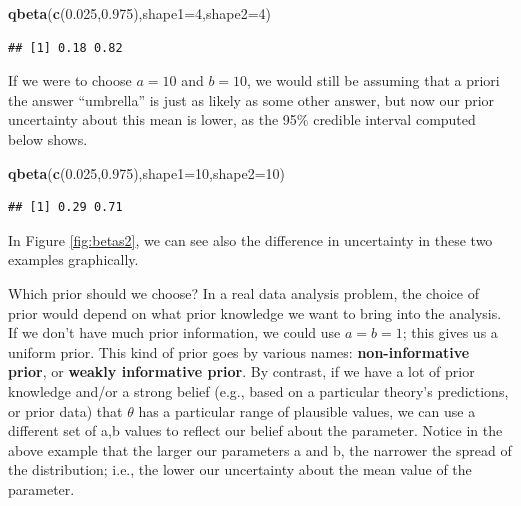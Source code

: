 \documentclass[12pt,]{krantz}
\newenvironment{Shaded}{\begin{snugshade}}{\end{snugshade}}
\newcommand{\DataTypeTok}[1]{\textcolor[rgb]{0.13,0.29,0.53}{#1}}
\newcommand{\DecValTok}[1]{\textcolor[rgb]{0.00,0.00,0.81}{#1}}
\newcommand{\FloatTok}[1]{\textcolor[rgb]{0.00,0.00,0.81}{#1}}
\newcommand{\KeywordTok}[1]{\textcolor[rgb]{0.13,0.29,0.53}{\textbf{#1}}}
\newcommand{\NormalTok}[1]{#1}
\theoremstyle{definition}
\theoremstyle{definition}
\theoremstyle{definition}
\theoremstyle{remark}
\begin{document}
\begin{Shaded}
\begin{Highlighting}[]
\KeywordTok{qbeta}\NormalTok{(}\KeywordTok{c}\NormalTok{(}\FloatTok{0.025}\NormalTok{,}\FloatTok{0.975}\NormalTok{),}\DataTypeTok{shape1=}\DecValTok{4}\NormalTok{,}\DataTypeTok{shape2=}\DecValTok{4}\NormalTok{)}
\end{Highlighting}
\end{Shaded}

\begin{verbatim}
## [1] 0.18 0.82
\end{verbatim}

If we were to choose \(a=10\) and \(b=10\), we would still be assuming that a priori the answer ``umbrella'' is just as likely as some other answer, but now our prior uncertainty about this mean is lower, as the 95\% credible interval computed below shows.

\begin{Shaded}
\begin{Highlighting}[]
\KeywordTok{qbeta}\NormalTok{(}\KeywordTok{c}\NormalTok{(}\FloatTok{0.025}\NormalTok{,}\FloatTok{0.975}\NormalTok{),}\DataTypeTok{shape1=}\DecValTok{10}\NormalTok{,}\DataTypeTok{shape2=}\DecValTok{10}\NormalTok{)}
\end{Highlighting}
\end{Shaded}

\begin{verbatim}
## [1] 0.29 0.71
\end{verbatim}

In Figure \ref{fig:betas2}, we can see also the difference in uncertainty in these two examples graphically.

Which prior should we choose? In a real data analysis problem, the choice of prior would depend on what prior knowledge we want to bring into the analysis. If we don't have much prior information, we could use \(a=b=1\); this gives us a uniform prior. This kind of prior goes by various names: \textbf{non-informative prior}, or \textbf{weakly informative prior}. By contrast, if we have a lot of prior knowledge and/or a strong belief (e.g., based on a particular theory's predictions, or prior data) that \(\theta\) has a particular range of plausible values, we can use a different set of a,b values to reflect our belief about the parameter. Notice in the above example that the larger our parameters a and b, the narrower the spread of the distribution; i.e., the lower our uncertainty about the mean value of the parameter.
\end{document}
